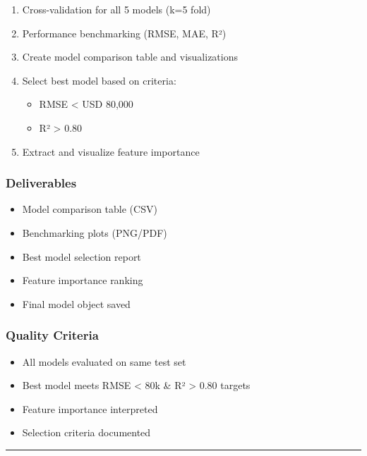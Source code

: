 \documentclass[
  english,
  letterpaper,
  DIV=11,
  numbers=noendperiod]{scrreprt}
\providecommand{\tightlist}{%
  \setlength{\itemsep}{0pt}\setlength{\parskip}{0pt}}
\begin{document}
\begin{enumerate}
\def\labelenumi{\arabic{enumi}.}
\tightlist
\item
  Cross-validation for all 5 models (k=5 fold)
\item
  Performance benchmarking (RMSE, MAE, R²)
\item
  Create model comparison table and visualizations
\item
  Select best model based on criteria:

  \begin{itemize}
  \tightlist
  \item
    RMSE \textless{} USD 80,000
  \item
    R² \textgreater{} 0.80
  \end{itemize}
\item
  Extract and visualize feature importance
\end{enumerate}

\subsubsection{Deliverables}\label{deliverables-6}

\begin{itemize}
\tightlist
\item
  Model comparison table (CSV)
\item
  Benchmarking plots (PNG/PDF)
\item
  Best model selection report
\item
  Feature importance ranking
\item
  Final model object saved
\end{itemize}

\subsubsection{Quality Criteria}\label{quality-criteria-5}

\begin{itemize}
\tightlist
\item[$\square$]
  All models evaluated on same test set
\item[$\square$]
  Best model meets RMSE \textless{} 80k \& R² \textgreater{} 0.80
  targets
\item[$\square$]
  Feature importance interpreted
\item[$\square$]
  Selection criteria documented
\end{itemize}

\begin{center}\rule{0.5\linewidth}{0.5pt}\end{center}
\end{document}

